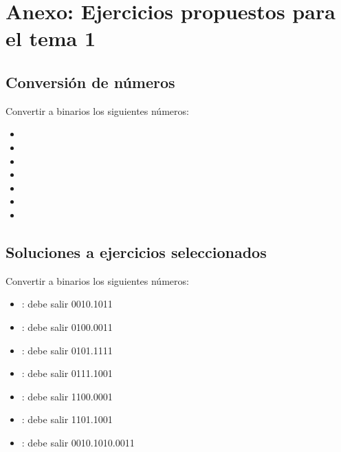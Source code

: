 \documentclass[letterpaper,10pt,spanish]{sphinxmanual}
\begin{document}
\chapter{Anexo: Ejercicios propuestos para el tema 1}
\label{\detokenize{anexos/t1_ejercicios:anexo-ejercicios-propuestos-para-el-tema-1}}\label{\detokenize{anexos/t1_ejercicios::doc}}

\section{Conversión de números}
\label{\detokenize{anexos/t1_ejercicios:conversion-de-numeros}}
\sphinxAtStartPar
Convertir a binarios los siguientes números:
\begin{itemize}
\item {} 

\item {} 

\item {} 

\item {} 

\item {} 

\item {} 

\item {} 

\end{itemize}


\section{Soluciones a ejercicios seleccionados}
\label{\detokenize{anexos/t1_ejercicios:soluciones-a-ejercicios-seleccionados}}
\sphinxAtStartPar
Convertir a binarios los siguientes números:
\begin{itemize}
\item {} 
: debe salir 0010.1011

\item {} 
: debe salir 0100.0011

\item {} 
: debe salir 0101.1111

\item {} 
: debe salir 0111.1001

\item {} 
: debe salir 1100.0001

\item {} 
: debe salir 1101.1001

\item {} 
: debe salir 0010.1010.0011

\end{itemize}
\end{document}
